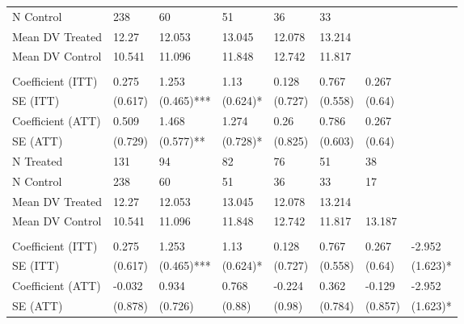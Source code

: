 \begin{table}[!h]
\begin{threeparttable}
\begin{tabular}[t]{llllllll}
\hspace{1em}N Control & 238 & 60 & 51 & 36 & 33 &  & \\
\hspace{1em}Mean DV Treated & 12.27 & 12.053 & 13.045 & 12.078 & 13.214 &  \vphantom{1} & \\
\hspace{1em}Mean DV Control & 10.541 & 11.096 & 11.848 & 12.742 & 11.817 &  & \\
\addlinespace[0.3em]
\multicolumn{8}{l}{\textbf{Panel C: t* = 6}}\\
\hspace{1em}Coefficient (ITT) & 0.275 & 1.253 & 1.13 & 0.128 & 0.767 & 0.267 & \\
\hspace{1em}SE (ITT) & (0.617) & (0.465)*** & (0.624)* & (0.727) & (0.558) & (0.64) & \\
\hspace{1em}Coefficient (ATT) & 0.509 & 1.468 & 1.274 & 0.26 & 0.786 & 0.267 & \\
\hspace{1em}SE (ATT) & (0.729) & (0.577)** & (0.728)* & (0.825) & (0.603) & (0.64) & \\
\hspace{1em}N Treated & 131 & 94 & 82 & 76 & 51 & 38 & \\
\hspace{1em}N Control & 238 & 60 & 51 & 36 & 33 & 17 & \\
\hspace{1em}Mean DV Treated & 12.27 & 12.053 & 13.045 & 12.078 & 13.214 &  & \\
\hspace{1em}Mean DV Control & 10.541 & 11.096 & 11.848 & 12.742 & 11.817 & 13.187 \vphantom{1} & \\
\addlinespace[0.3em]
\multicolumn{8}{l}{\textbf{Panel D: t* = 7}}\\
\hspace{1em}Coefficient (ITT) & 0.275 & 1.253 & 1.13 & 0.128 & 0.767 & 0.267 & -2.952\\
\hspace{1em}SE (ITT) & (0.617) & (0.465)*** & (0.624)* & (0.727) & (0.558) & (0.64) & (1.623)*\\
\hspace{1em}Coefficient (ATT) & -0.032 & 0.934 & 0.768 & -0.224 & 0.362 & -0.129 & -2.952\\
\hspace{1em}SE (ATT) & (0.878) & (0.726) & (0.88) & (0.98) & (0.784) & (0.857) & (1.623)*\\

\end{tabular}
\end{threeparttable}
\end{table}
